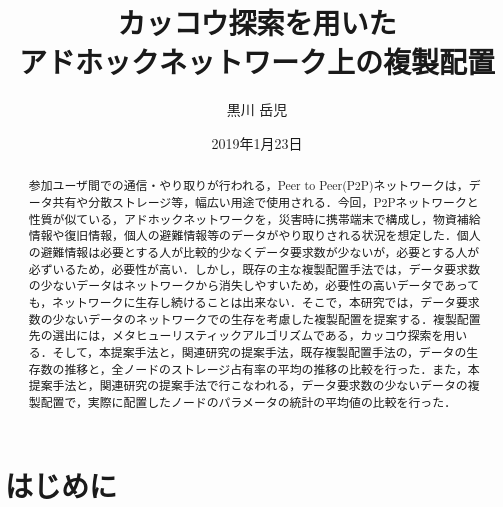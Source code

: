 \documentclass[11pt]{jreport}
\title{カッコウ探索を用いた\\
アドホックネットワーク上の複製配置}
\author{黒川 岳児}
\date{2019年1月23日}	%
\begin{document}
\maketitle

\begin{abstract}
参加ユーザ間での通信・やり取りが行われる，Peer to Peer(P2P)ネットワークは，データ共有や分散ストレージ等，幅広い用途で使用される．今回，P2Pネットワークと性質が似ている，アドホックネットワークを，災害時に携帯端末で構成し，物資補給情報や復旧情報，個人の避難情報等のデータがやり取りされる状況を想定した．個人の避難情報は必要とする人が比較的少なくデータ要求数が少ないが，必要とする人が必ずいるため，必要性が高い．しかし，既存の主な複製配置手法では，データ要求数の少ないデータはネットワークから消失しやすいため，必要性の高いデータであっても，ネットワークに生存し続けることは出来ない．そこで，本研究では，データ要求数の少ないデータのネットワークでの生存を考慮した複製配置を提案する．複製配置先の選出には，メタヒューリスティックアルゴリズムである，カッコウ探索を用いる．そして，本提案手法と，関連研究の提案手法，既存複製配置手法の，データの生存数の推移と，全ノードのストレージ占有率の平均の推移の比較を行った．また，本提案手法と，関連研究の提案手法で行こなわれる，データ要求数の少ないデータの複製配置で，実際に配置したノードのパラメータの統計の平均値の比較を行った．
\end{abstract}

\tableofcontents

\listoffigures

\listoftables

\newpage
{}	%



\chapter{はじめに}
\end{document}
